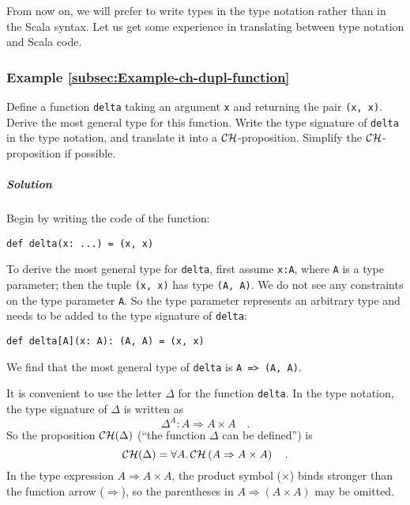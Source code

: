 From now on, we will prefer to write types in the type notation rather
than in the Scala syntax. Let us get some experience in translating
between type notation and Scala code.

\subsubsection{Example \label{subsec:Example-ch-dupl-function}\ref{subsec:Example-ch-dupl-function}}

Define a function \lstinline!delta!
taking an argument \lstinline!x!
and returning the pair \lstinline!(x, x)!.
Derive the most general type for this function. Write the type signature
of \lstinline!delta! in
the type notation, and translate it into a ${\cal CH}$-proposition.
Simplify the ${\cal CH}$-proposition if possible.

\subparagraph{Solution}

Begin by writing the code of the function:
\begin{lstlisting}
def delta(x: ...) = (x, x)
\end{lstlisting}
To derive the most general type for \lstinline!delta!,
first assume \lstinline!x:A!,
where \lstinline!A! is
a type parameter; then the tuple \lstinline!(x, x)!
has type \lstinline!(A, A)!.
We do not see any constraints on the type parameter \lstinline!A!.
So the type parameter represents an arbitrary type and needs to be
added to the type signature of \lstinline!delta!:
\begin{lstlisting}
def delta[A](x: A): (A, A) = (x, x)
\end{lstlisting}
We find that the most general type of \lstinline!delta!
is \lstinline!A => (A, A)!.

It is convenient to use the letter $\Delta$ for the function \lstinline!delta!.
In the type notation, the type signature of $\Delta$ is written as
\[
\Delta^{A}:A\Rightarrow A\times A\quad.
\]
So the proposition ${\cal CH}(\Delta)$ (``the function $\Delta$
can be defined'') is
\[
{\cal CH}(\Delta)=\forall A.{\cal \,CH}\left(A\Rightarrow A\times A\right)\quad.
\]
In the type expression $A\Rightarrow A\times A$, the product symbol
($\times$) binds stronger than the function arrow ($\Rightarrow$),
so the parentheses in $A\Rightarrow\left(A\times A\right)$ may be
omitted.


